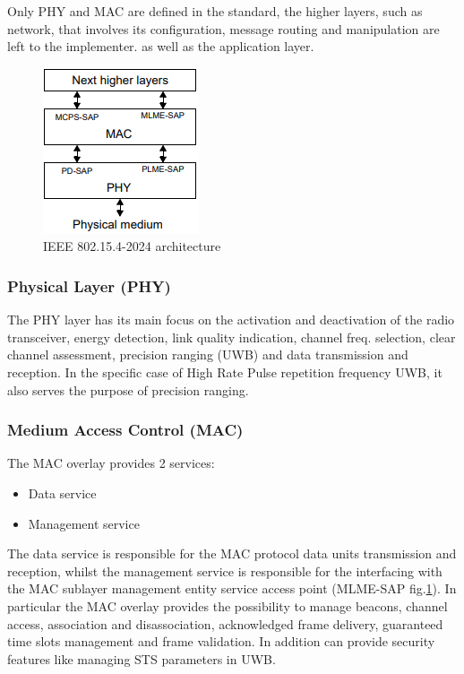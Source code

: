 \documentclass[conference]{IEEEtran}
\begin{document}
Only PHY and MAC are defined in the standard\cite{10794632}, the higher layers, such as network,
that involves its configuration, message routing and manipulation are left to the implementer.
as well as the application layer.\\

\begin{figure}[!h]
  \centering
  \includegraphics[width=.5\linewidth]{layers}
  \caption{IEEE 802.15.4-2024 architecture}
  \label{fig:layers}
\end{figure}

\subsubsection{Physical Layer (PHY)}
The PHY layer has its main focus on the activation and deactivation of the radio transceiver,
energy detection, link quality indication, channel freq. selection, clear channel assessment,
precision ranging (UWB) and data transmission and reception.
In the specific case of High Rate Pulse repetition frequency UWB, it also serves the purpose 
of precision ranging.

\subsubsection{Medium Access Control (MAC)}
The MAC overlay provides 2 services:
\begin{itemize}
    \item Data service
    \item Management service
\end{itemize}
The data service is responsible for the MAC protocol data units transmission and reception,
whilst the management service is responsible for the interfacing with the MAC sublayer 
management entity service access point (MLME-SAP fig.\ref{fig:layers}).
In particular the MAC overlay provides the possibility to manage beacons, channel access,
association and disassociation, acknowledged frame delivery, guaranteed time slots management
and frame validation. In addition can provide security features like managing STS parameters 
in UWB.
\end{document}
